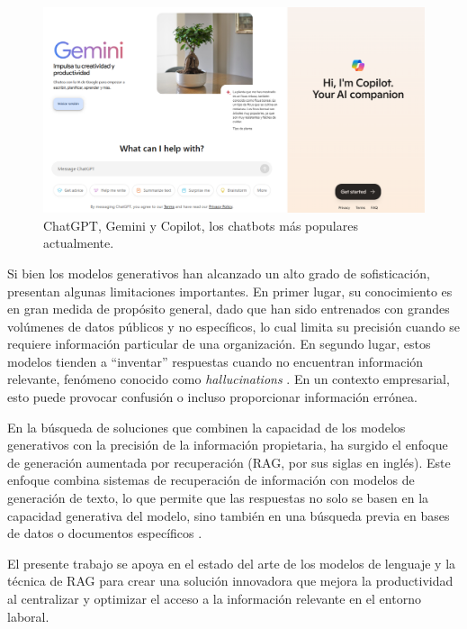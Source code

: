 \vspace{25mm}

\begin{figure}[ht]
	\centering
	\includegraphics[scale=.38]{./Figures/chatbots.png}
	\caption{ChatGPT, Gemini y Copilot, los chatbots más populares actualmente.}
	\label{fig:chatbots}
\end{figure}

\vspace{10mm}

Si bien los modelos generativos han alcanzado un alto grado de sofisticación, presentan algunas limitaciones importantes. 
En primer lugar, su conocimiento es en gran medida de propósito general, dado que han sido entrenados con grandes volúmenes 
de datos públicos y no específicos, lo cual limita su precisión cuando se requiere información particular de una organización. 
En segundo lugar, estos modelos tienden a ``inventar'' respuestas cuando no encuentran información relevante, fenómeno conocido 
como \textit{hallucinations} \citep{article:hallucinations}. En un contexto empresarial, esto puede provocar confusión o incluso 
proporcionar información errónea.

En la búsqueda de soluciones que combinen la capacidad de los modelos generativos con la precisión de la información propietaria, 
ha surgido el enfoque de generación aumentada por recuperación (RAG, por sus siglas en inglés). Este enfoque combina sistemas de 
recuperación de información con modelos de generación de texto, lo que permite que las respuestas no solo se basen en la capacidad 
generativa del modelo, sino también en una búsqueda previa en bases de datos o documentos específicos \citep{paper:rag-1} 
\citep{paper:rag-2}.

El presente trabajo se apoya en el estado del arte de los modelos de lenguaje y la técnica de RAG para crear una solución innovadora 
que mejora la productividad al centralizar y optimizar el acceso a la información relevante en el entorno laboral.

